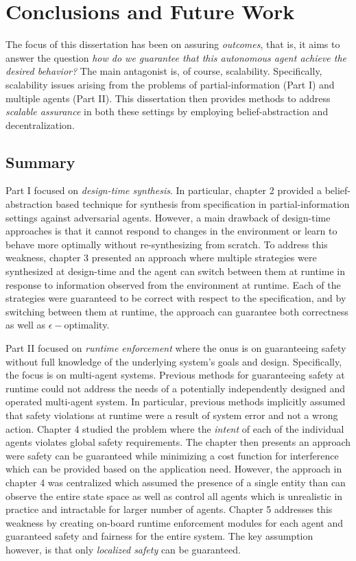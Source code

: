 \chapter{Conclusions and Future Work}
The focus of this dissertation has been on assuring \emph{outcomes}, that is, it aims to answer the question \emph{how do we guarantee that this autonomous agent achieve the desired behavior?} The main antagonist is, of course, scalability. Specifically, scalability issues arising from the problems of partial-information (Part I) and multiple agents (Part II). This dissertation then provides methods to address \emph{scalable assurance} in both these settings by employing belief-abstraction and decentralization. 

\section{Summary}
Part I focused on \emph{design-time synthesis}. In particular, chapter 2 provided a belief-abstraction based technique for synthesis from specification in partial-information settings against adversarial agents. However, a main drawback of design-time approaches is that it cannot respond to changes in the environment or learn to behave more optimally without re-synthesizing from scratch. To address this weakness, chapter 3 presented an approach where multiple strategies were synthesized at design-time and the agent can switch between them at runtime in response to information observed from the environment at runtime. Each of the strategies were guaranteed to be correct with respect to the specification, and by switching between them at runtime, the approach can guarantee both correctness as well as $\epsilon-$optimality. 

Part II focused on \emph{runtime enforcement} where the onus is on guaranteeing safety without full knowledge of the underlying system's goals and design. Specifically, the focus is on multi-agent systems. Previous methods for guaranteeing safety at runtime could not address the needs of a potentially independently designed and operated multi-agent system. In particular, previous methods implicitly assumed that safety violations at runtime were a result of system error and not a wrong action. Chapter 4 studied the problem where the \emph{intent} of each of the individual agents violates global safety requirements. The chapter then presents an approach were safety can be guaranteed while minimizing a cost function for interference which can be provided based on the application need. However, the approach in chapter 4 was centralized which assumed the presence of a single entity than can observe the entire state space as well as control all agents which is unrealistic in practice and intractable for larger number of agents. Chapter 5 addresses this weakness by creating on-board runtime enforcement modules for each agent and guaranteed safety and fairness for the entire system. The key assumption however, is that only \emph{localized safety} can be guaranteed. 

